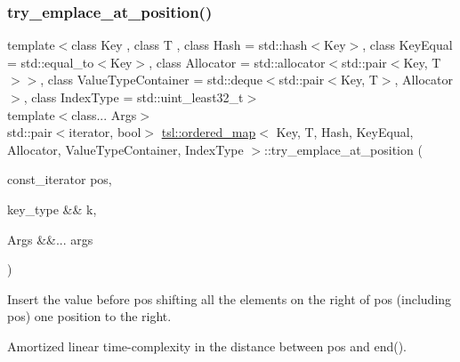 \subsubsection{\texorpdfstring{try\_emplace\_at\_position()}{try\_emplace\_at\_position()}\hspace{0.1cm}{\footnotesize\ttfamily [2/2]}}
{\footnotesize\ttfamily template$<$class Key , class T , class Hash  = std\+::hash$<$\+Key$>$, class Key\+Equal  = std\+::equal\+\_\+to$<$\+Key$>$, class Allocator  = std\+::allocator$<$std\+::pair$<$\+Key, T$>$$>$, class Value\+Type\+Container  = std\+::deque$<$std\+::pair$<$\+Key, T$>$, Allocator$>$, class Index\+Type  = std\+::uint\+\_\+least32\+\_\+t$>$ \\
template$<$class... Args$>$ \\
std\+::pair$<$iterator, bool$>$ \mbox{\hyperlink{classtsl_1_1ordered__map}{tsl\+::ordered\+\_\+map}}$<$ Key, T, Hash, Key\+Equal, Allocator, Value\+Type\+Container, Index\+Type $>$\+::try\+\_\+emplace\+\_\+at\+\_\+position (\begin{DoxyParamCaption}\item[{const\+\_\+iterator}]{pos,  }\item[{key\+\_\+type \&\&}]{k,  }\item[{Args \&\&...}]{args }\end{DoxyParamCaption})\hspace{0.3cm}{\ttfamily [inline]}}





Insert the value before pos shifting all the elements on the right of pos (including pos) one position to the right.

Amortized linear time-\/complexity in the distance between pos and end(). \mbox{\label{classtsl_1_1ordered__map_a53ec4038c6c279995e3ce96414b959a8}} 
